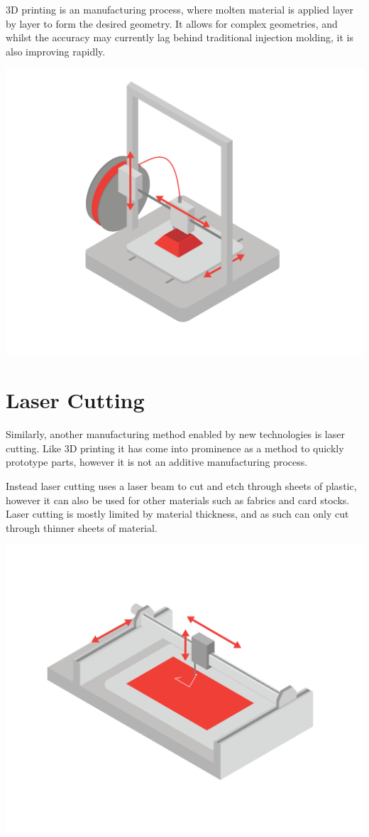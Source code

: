3D printing is an  manufacturing process, where molten material is applied layer by layer to form the desired geometry. It allows for complex geometries, and whilst the accuracy may currently lag behind traditional injection molding, it is also improving rapidly.

\includegraphics[width=.75\textwidth]{3dprinter.png}


\section{Laser Cutting}

Similarly, another manufacturing method enabled by new technologies is laser cutting. Like 3D printing it has come into prominence as a method to quickly prototype parts, however it is not an additive manufacturing process.

Instead laser cutting uses a laser beam to cut and etch through sheets of plastic, however it can also be used for other materials such as fabrics and card stocks. Laser cutting is mostly limited by material thickness, and as such can only cut through thinner sheets of material.

\includegraphics[width=.75\textwidth]{cnc.png}

